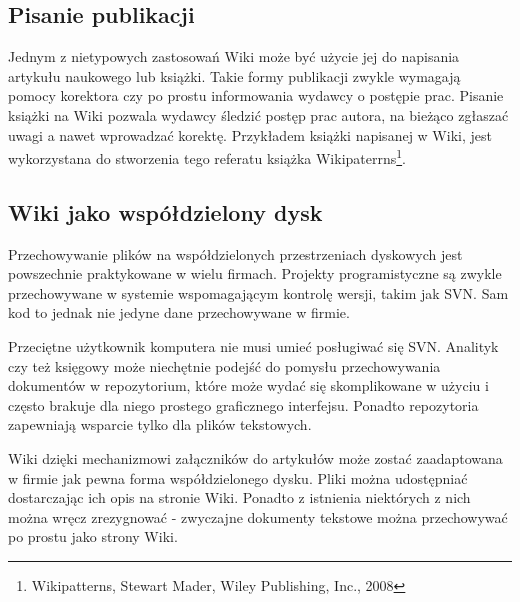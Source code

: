 \documentclass{article}
\begin{document}

	\subsection{Pisanie publikacji}

		Jednym z nietypowych zastosowań Wiki może być użycie jej do napisania artykułu naukowego lub książki. Takie formy publikacji zwykle wymagają pomocy korektora czy po prostu informowania wydawcy o postępie prac. Pisanie książki na Wiki pozwala wydawcy śledzić postęp prac autora, na bieżąco zgłaszać uwagi a nawet wprowadzać korektę. Przykładem książki napisanej w Wiki, jest wykorzystana  do stworzenia tego referatu książka Wikipaterrns\footnote{Wikipatterns, Stewart Mader, Wiley Publishing, Inc., 2008}.


	\subsection{Wiki jako współdzielony dysk}
		Przechowywanie plików na współdzielonych przestrzeniach dyskowych jest powszechnie praktykowane w wielu firmach. Projekty programistyczne są zwykle przechowywane w systemie wspomagającym kontrolę wersji, takim jak SVN. Sam kod to jednak nie jedyne dane przechowywane w firmie. 

		Przeciętne użytkownik komputera nie musi umieć posługiwać się SVN. Analityk czy też księgowy może niechętnie podejść do pomysłu przechowywania dokumentów w repozytorium, które może wydać się skomplikowane w użyciu i często brakuje dla niego prostego graficznego interfejsu. Ponadto repozytoria zapewniają wsparcie tylko dla plików tekstowych. 

		Wiki dzięki mechanizmowi załączników do artykułów może zostać zaadaptowana w firmie jak pewna forma współdzielonego dysku. Pliki można udostępniać dostarczając ich opis na stronie Wiki. Ponadto z istnienia niektórych z nich można wręcz zrezygnować - zwyczajne dokumenty tekstowe można przechowywać po prostu jako strony Wiki.
\end{document}
